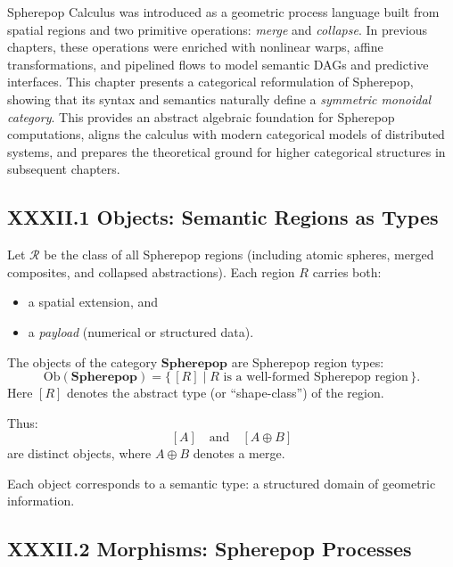 \documentclass[12pt,letterpaper]{article}
\begin{document}
Spherepop Calculus was introduced as a geometric process language built from spatial regions and two primitive operations: \emph{merge} and \emph{collapse}. In previous chapters, these operations were enriched with nonlinear warps, affine transformations, and pipelined flows to model semantic DAGs and predictive interfaces. This chapter presents a categorical reformulation of Spherepop, showing that its syntax and semantics naturally define a \emph{symmetric monoidal category}. This provides an abstract algebraic foundation for Spherepop computations, aligns the calculus with modern categorical models of distributed systems, and prepares the theoretical ground for higher categorical structures in subsequent chapters.

\subsection{XXXII.1 Objects: Semantic Regions as Types}

Let $\mathcal{R}$ be the class of all Spherepop regions (including atomic spheres, merged composites, and collapsed abstractions). Each region $R$ carries both:

\begin{itemize}
    \item a spatial extension, and 
    \item a \emph{payload} (numerical or structured data).
\end{itemize}

\begin{definition}
The objects of the category $\mathbf{Spherepop}$ are Spherepop region types:
\[
\mathrm{Ob}(\mathbf{Spherepop}) = \{\, [R] \mid R \text{ is a well-formed Spherepop region}\,\}.
\]
Here $[R]$ denotes the abstract type (or ``shape-class'') of the region.
\end{definition}

Thus:
\[
[A] \quad\text{and}\quad [A \oplus B]
\]
are distinct objects, where $A \oplus B$ denotes a merge.

Each object corresponds to a semantic type: a structured domain of geometric information.

\subsection{XXXII.2 Morphisms: Spherepop Processes}
\end{document}
